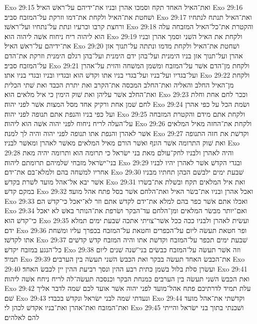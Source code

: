 Exo 29:15  ואת־האיל האחד תקח וסמכו אהרן ובניו את־ידיהם על־ראשׁ האיל׃
Exo 29:16  ושׁחטת את־האיל ולקחת את־דמו וזרקת על־המזבח סביב׃
Exo 29:17  ואת־האיל תנתח לנתחיו ורחצת קרבו וכרעיו ונתת על־נתחיו ועל־ראשׁו׃
Exo 29:18  והקטרת את־כל־האיל המזבחה עלה הוא ליהוה ריח ניחוח אשׁה ליהוה הוא׃
Exo 29:19  ולקחת את האיל השׁני וסמך אהרן ובניו את־ידיהם על־ראשׁ האיל׃
Exo 29:20  ושׁחטת את־האיל ולקחת מדמו ונתתה על־תנוך אזן אהרן ועל־תנוך אזן בניו הימנית ועל־בהן ידם הימנית ועל־בהן רגלם הימנית וזרקת את־הדם על־המזבח סביב׃
Exo 29:21  ולקחת מן־הדם אשׁר על־המזבח ומשׁמן המשׁחה והזית על־אהרן ועל־בגדיו ועל־בניו ועל־בגדי בניו אתו וקדשׁ הוא ובגדיו ובניו ובגדי בניו אתו׃
Exo 29:22  ולקחת מן־האיל החלב והאליה ואת־החלב המכסה את־הקרב ואת יתרת הכבד ואת שׁתי הכלית ואת־החלב אשׁר עליהן ואת שׁוק הימין כי איל מלאים הוא׃
Exo 29:23  וככר לחם אחת וחלת לחם שׁמן אחת ורקיק אחד מסל המצות אשׁר לפני יהוה׃
Exo 29:24  ושׂמת הכל על כפי אהרן ועל כפי בניו והנפת אתם תנופה לפני יהוה׃
Exo 29:25  ולקחת אתם מידם והקטרת המזבחה על־העלה לריח ניחוח לפני יהוה אשׁה הוא ליהוה׃
Exo 29:26  ולקחת את־החזה מאיל המלאים אשׁר לאהרן והנפת אתו תנופה לפני יהוה והיה לך למנה׃
Exo 29:27  וקדשׁת את חזה התנופה ואת שׁוק התרומה אשׁר הונף ואשׁר הורם מאיל המלאים מאשׁר לאהרן ומאשׁר לבניו׃
Exo 29:28  והיה לאהרן ולבניו לחק־עולם מאת בני ישׂראל כי תרומה הוא ותרומה יהיה מאת בני־ישׂראל מזבחי שׁלמיהם תרומתם ליהוה׃
Exo 29:29  ובגדי הקדשׁ אשׁר לאהרן יהיו לבניו אחריו למשׁחה בהם ולמלא־בם את־ידם׃
Exo 29:30  שׁבעת ימים ילבשׁם הכהן תחתיו מבניו אשׁר יבא אל־אהל מועד לשׁרת בקדשׁ׃
Exo 29:31  ואת איל המלאים תקח ובשׁלת את־בשׂרו במקם קדשׁ׃
Exo 29:32  ואכל אהרן ובניו את־בשׂר האיל ואת־הלחם אשׁר בסל פתח אהל מועד׃
Exo 29:33  ואכלו אתם אשׁר כפר בהם למלא את־ידם לקדשׁ אתם וזר לא־יאכל כי־קדשׁ הם׃
Exo 29:34  ואם־יותר מבשׂר המלאים ומן־הלחם עד־הבקר ושׂרפת את־הנותר באשׁ לא יאכל כי־קדשׁ הוא׃
Exo 29:35  ועשׂית לאהרן ולבניו ככה ככל אשׁר־צויתי אתכה שׁבעת ימים תמלא ידם׃
Exo 29:36  ופר חטאת תעשׂה ליום על־הכפרים וחטאת על־המזבח בכפרך עליו ומשׁחת אתו לקדשׁו׃
Exo 29:37  שׁבעת ימים תכפר על־המזבח וקדשׁת אתו והיה המזבח קדשׁ קדשׁים כל־הנגע במזבח יקדשׁ׃
Exo 29:38  וזה אשׁר תעשׂה על־המזבח כבשׂים בני־שׁנה שׁנים ליום תמיד׃
Exo 29:39  את־הכבשׂ האחד תעשׂה בבקר ואת הכבשׂ השׁני תעשׂה בין הערבים׃
Exo 29:40  ועשׂרן סלת בלול בשׁמן כתית רבע ההין ונסך רביעת ההין יין לכבשׂ האחד׃
Exo 29:41  ואת הכבשׂ השׁני תעשׂה בין הערבים כמנחת הבקר וכנסכה תעשׂה־לה לריח ניחח אשׁה ליהוה׃
Exo 29:42  עלת תמיד לדרתיכם פתח אהל־מועד לפני יהוה אשׁר אועד לכם שׁמה לדבר אליך שׁם׃
Exo 29:43  ונעדתי שׁמה לבני ישׂראל ונקדשׁ בכבדי׃
Exo 29:44  וקדשׁתי את־אהל מועד ואת־המזבח ואת־אהרן ואת־בניו אקדשׁ לכהן לי׃
Exo 29:45  ושׁכנתי בתוך בני ישׂראל והייתי להם לאלהים׃
